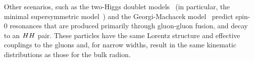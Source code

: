 Other scenarios, such as the two-Higgs doublet models~\cite{Branco:2011iw} (in particular, the minimal supersymmetric model~\cite{Djouadi:2005gj}) and the Georgi-Machacek model~\cite{GEORGI1985463} predict spin-0 resonances that are produced primarily through gluon-gluon fusion, and decay to an $HH$ pair.
These particles have the same Lorentz structure and effective couplings to the gluons and, for narrow widths, result in the same kinematic distributions as those for the bulk radion.


